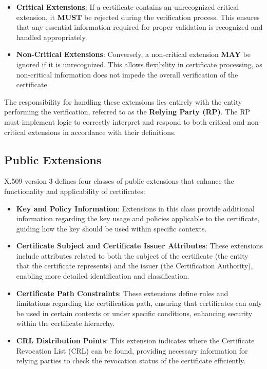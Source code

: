 \begin{itemize}
  \item \textbf{Critical Extensions}: If a certificate contains an
    unrecognized critical extension, it \textbf{MUST} be rejected
    during the verification process. This ensures that any essential
    information required for proper validation is recognized and
    handled appropriately.

  \item \textbf{Non-Critical Extensions}: Conversely, a non-critical
    extension \textbf{MAY} be ignored if it is unrecognized. This
    allows flexibility in certificate processing, as non-critical
    information does not impede the overall verification of the
    certificate.
\end{itemize}

The responsibility for handling these extensions lies entirely with
the entity performing the verification, referred to as the
\textbf{Relying Party (RP)}. The RP must implement logic to correctly
interpret and respond to both critical and non-critical extensions in
accordance with their definitions.

\subsection{Public Extensions}

X.509 version 3 defines four classes of public extensions that enhance
the functionality and applicability of certificates:

\begin{itemize}
  \item \textbf{Key and Policy Information}: Extensions in this
    class provide additional information regarding the key usage and
    policies applicable to the certificate, guiding how the key
    should be used within specific contexts.

  \item \textbf{Certificate Subject and Certificate Issuer
    Attributes}: These extensions include attributes related to both
    the subject of the certificate (the entity that the certificate
    represents) and the issuer (the Certification Authority),
    enabling more detailed identification and classification.

  \item \textbf{Certificate Path Constraints}: These extensions
    define rules and limitations regarding the certification path,
    ensuring that certificates can only be used in certain contexts
    or under specific conditions, enhancing security within the
    certificate hierarchy.

  \item \textbf{CRL Distribution Points}: This extension indicates
    where the Certificate Revocation List (CRL) can be found,
    providing necessary information for relying parties to check the
    revocation status of the certificate efficiently.
\end{itemize}

